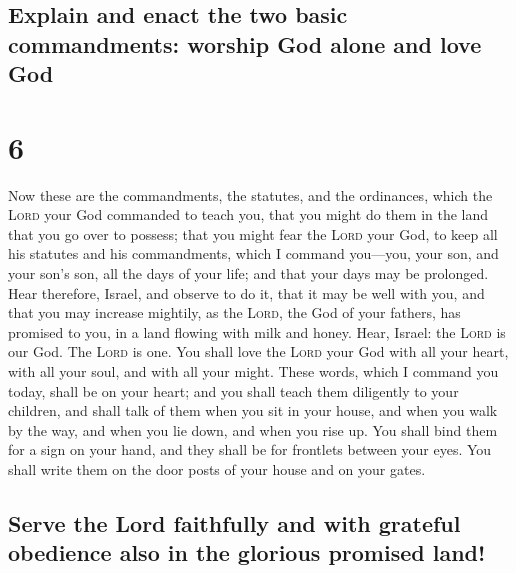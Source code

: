 \hypertarget{explain-and-enact-the-two-basic-commandments-worship-god-alone-and-love-god}{%
\subsection{Explain and enact the two basic commandments: worship God
alone and love
God}\label{explain-and-enact-the-two-basic-commandments-worship-god-alone-and-love-god}}

\hypertarget{section-5}{%
\section{6}\label{section-5}}

 Now these are the commandments, the statutes, and the
ordinances, which the \textsc{Lord} your God commanded to teach you,
that you might do them in the land that you go over to possess;
 that you might fear the \textsc{Lord} your God, to keep
all his statutes and his commandments, which I command you---you, your
son, and your son's son, all the days of your life; and that your days
may be prolonged.  Hear therefore, Israel, and observe to
do it, that it may be well with you, and that you may increase mightily,
as the \textsc{Lord}, the God of your fathers, has promised to you, in a
land flowing with milk and honey.  Hear, Israel: the
\textsc{Lord} is our God. The \textsc{Lord} is one.  You
shall love the \textsc{Lord} your God with all your heart, with all your
soul, and with all your might.  These words, which I
command you today, shall be on your heart;  and you shall
teach them diligently to your children, and shall talk of them when you
sit in your house, and when you walk by the way, and when you lie down,
and when you rise up.  You shall bind them for a sign on
your hand, and they shall be for frontlets between your eyes.
 You shall write them on the door posts of your house and
on your gates.

\hypertarget{serve-the-lord-faithfully-and-with-grateful-obedience-also-in-the-glorious-promised-land}{%
\subsection{Serve the Lord faithfully and with grateful obedience also
in the glorious promised
land!}\label{serve-the-lord-faithfully-and-with-grateful-obedience-also-in-the-glorious-promised-land}}

